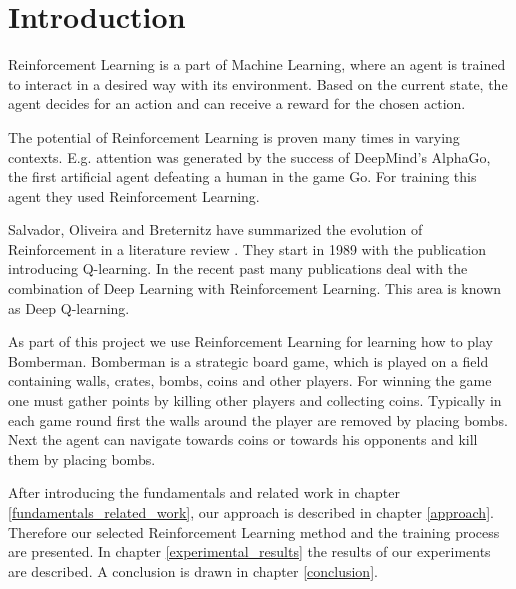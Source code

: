 \section{Introduction}

Reinforcement Learning is a part of Machine Learning, where an agent is trained to interact in a desired way with its environment. Based on the current state, the agent decides for an action and can receive a reward for the chosen action. \cite{salvadorReinforcementLearningLiterature2020}

The potential of Reinforcement Learning is proven many times in varying contexts. E.g. attention was generated by the success of DeepMind's AlphaGo, the first artificial agent defeating a human in the game Go. For training this agent they used Reinforcement Learning. \cite{Silver1140}

Salvador, Oliveira and Breternitz have summarized the evolution of Rein\-force\-ment in a literature review \cite{salvadorReinforcementLearningLiterature2020}. They start in 1989 with the publication introducing Q-learning. In the recent past many publications deal with the combination of Deep Learning with Reinforcement Learning. This area is known as Deep Q-learning.

As part of this project we use Reinforcement Learning for learning how to play Bomberman. Bomberman is a strategic board game, which is played on a field containing walls, crates, bombs, coins and other players. For winning the game one must gather points by killing other players and collecting coins. Typically in each game round first the walls around the player are removed by placing bombs. Next the agent can navigate towards coins or towards his opponents and kill them by placing bombs. \cite{Kormelink2018}

After introducing the fundamentals and related work in chapter \ref{fundamentals_related_work}, our approach is described in chapter \ref{approach}. Therefore our selected Reinforcement Learning method and the training process are presented. In chapter \ref{experimental_results} the results of our experiments are described. A conclusion is drawn in chapter \ref{conclusion}.